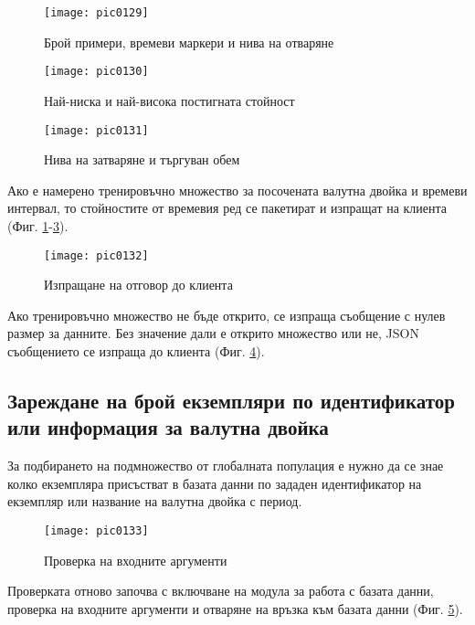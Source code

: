 \begin{figure}[h]
  \centering
  \texttt{[image: pic0129]}
  \caption{Брой примери, времеви маркери и нива на отваряне}
\label{fig:pic0129}
\end{figure}
\FloatBarrier

\begin{figure}[h]
  \centering
  \texttt{[image: pic0130]}
  \caption{Най-ниска и най-висока постигната стойност}
\label{fig:pic0130}
\end{figure}
\FloatBarrier

\begin{figure}[h]
  \centering
  \texttt{[image: pic0131]}
  \caption{Нива на затваряне и търгуван обем}
\label{fig:pic0131}
\end{figure}
\FloatBarrier

Ако е намерено тренировъчно множество за посочената валутна двойка и времеви интервал, то стойностите от времевия ред се пакетират и изпращат на клиента (Фиг. \ref{fig:pic0129}-\ref{fig:pic0131}).

\begin{figure}[h]
  \centering
  \texttt{[image: pic0132]}
  \caption{Изпращане на отговор до клиента}
\label{fig:pic0132}
\end{figure}
\FloatBarrier

Ако тренировъчно множество не бъде открито, се изпраща съобщение с нулев размер за данните. Без значение дали е открито множество или не, JSON съобщението се изпраща до клиента (Фиг. \ref{fig:pic0132}).

\subsection{Зареждане на брой екземпляри по идентификатор или информация за валутна двойка}

За подбирането на подмножество от глобалната популация е нужно да се знае колко екземпляра присъстват в базата данни по зададен идентификатор на екземпляр или название на валутна двойка с период. 

\begin{figure}[h]
  \centering
  \texttt{[image: pic0133]}
  \caption{Проверка на входните аргументи}
\label{fig:pic0133}
\end{figure}
\FloatBarrier

Проверката отново започва с включване на модула за работа с базата данни, проверка на входните аргументи и отваряне на връзка към базата данни (Фиг. \ref{fig:pic0133}).

